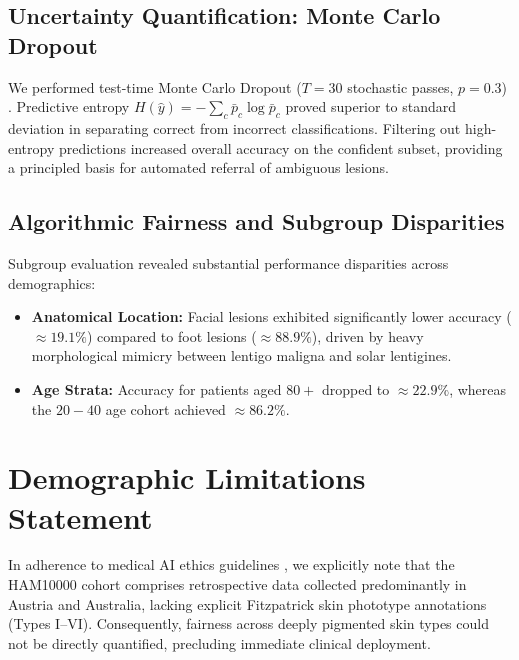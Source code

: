 \documentclass[journal,10pt,twocolumn]{IEEEtran}
\begin{document}
\subsection{Uncertainty Quantification: Monte Carlo Dropout}
We performed test-time Monte Carlo Dropout ($T=30$ stochastic passes, $p=0.3$) \cite{gal2016dropout}. Predictive entropy $H(\hat{y}) = -\sum_c \bar{p}_c \log \bar{p}_c$ proved superior to standard deviation in separating correct from incorrect classifications. Filtering out high-entropy predictions increased overall accuracy on the confident subset, providing a principled basis for automated referral of ambiguous lesions.

\subsection{Algorithmic Fairness and Subgroup Disparities}
Subgroup evaluation revealed substantial performance disparities across demographics:
\begin{itemize}
    \item \textbf{Anatomical Location:} Facial lesions exhibited significantly lower accuracy ($\approx 19.1\%$) compared to foot lesions ($\approx 88.9\%$), driven by heavy morphological mimicry between lentigo maligna and solar lentigines.
    \item \textbf{Age Strata:} Accuracy for patients aged $80+$ dropped to $\approx 22.9\%$, whereas the $20-40$ age cohort achieved $\approx 86.2\%$.
\end{itemize}

\section{Demographic Limitations Statement}
In adherence to medical AI ethics guidelines \cite{groh2021evaluating, daneshjou2022disparities, adamson2018machine}, we explicitly note that the HAM10000 cohort comprises retrospective data collected predominantly in Austria and Australia, lacking explicit Fitzpatrick skin phototype annotations (Types I–VI). Consequently, fairness across deeply pigmented skin types could not be directly quantified, precluding immediate clinical deployment.
\end{document}
